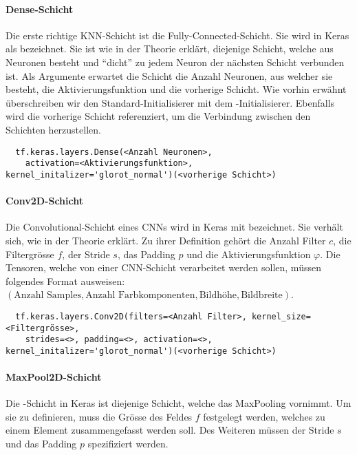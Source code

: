 \paragraph{Dense-Schicht}
Die erste richtige KNN-Schicht ist die Fully-Connected-Schicht. Sie wird in
Keras als  bezeichnet. Sie ist wie in
der Theorie erklärt, diejenige Schicht, welche aus Neuronen besteht und ``dicht'' zu jedem
Neuron der nächsten Schicht verbunden ist.
Als Argumente erwartet die Schicht die Anzahl Neuronen, aus welcher sie besteht,
die Aktivierungsfunktion und die vorherige Schicht. Wie vorhin erwähnt
überschreiben wir den Standard-Initialisierer mit dem
-Initialisierer. Ebenfalls wird die vorherige Schicht
referenziert, um die Verbindung zwischen den Schichten herzustellen.
\begin{verbatim}
  tf.keras.layers.Dense(<Anzahl Neuronen>,
    activation=<Aktivierungsfunktion>, kernel_initalizer='glorot_normal')(<vorherige Schicht>)
\end{verbatim}


\paragraph{Conv2D-Schicht}
Die Convolutional-Schicht eines CNNs wird in Keras mit 
bezeichnet. Sie verhält sich, wie in der Theorie erklärt. Zu ihrer Definition
gehört die Anzahl Filter $c$, die Filtergrösse $f$, der Stride $s$, das Padding
$p$ und die Aktivierungsfunktion $\varphi$.
Die Tensoren, welche von einer CNN-Schicht verarbeitet werden sollen, müssen
folgendes Format ausweisen: $(\text{Anzahl Samples}, \text{Anzahl
  Farbkomponenten}, \text{Bildhöhe}, \text{Bildbreite})$.
\begin{verbatim}
  tf.keras.layers.Conv2D(filters=<Anzahl Filter>, kernel_size=<Filtergrösse>,
    strides=<>, padding=<>, activation=<>, kernel_initalizer='glorot_normal')(<vorherige Schicht>)
\end{verbatim}

\paragraph{MaxPool2D-Schicht}
Die -Schicht in Keras ist diejenige Schicht, welche das MaxPooling vornimmt. Um sie zu
definieren, muss die Grösse des Feldes $f$ festgelegt werden, welches zu einem Element
zusammengefasst werden soll. Des Weiteren müssen der Stride $s$ und das Padding $p$
spezifiziert werden.

